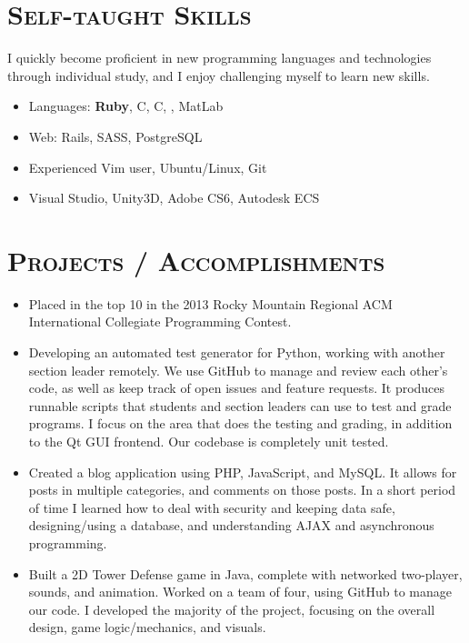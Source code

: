 \documentclass[11pt,letterpaper]{article}
\newcommand{\CPP}
{C\nolinebreak[4]\hspace{-.05em}\raisebox{.22ex}{\footnotesize\bf ++}}
\newcommand{\CS}
{C\nolinebreak[4]\hspace{-.05em}\raisebox{.22ex}{\footnotesize\bf \#}}
\begin{document}
\begin{minipage}{\textwidth}
\section{\scshape Self-taught Skills}
\vspace{-3mm}
I quickly become proficient in new programming languages and technologies through individual study,
and I enjoy challenging myself to learn new skills.
\vspace{2mm}
\begin{itemize}
 \item Languages: {\bfseries Ruby}, \CPP, \CS, \textls{\LaTeX}, MatLab
 \item Web: Rails, SASS, PostgreSQL
 \item Experienced Vim user, Ubuntu/Linux, Git
 \item Visual Studio, Unity3D, Adobe CS6, Autodesk ECS
\end{itemize}

\vspace{-3mm}
\section{\scshape Projects / Accomplishments}
\vspace{-3mm}

\begin{itemize}
 \item Placed in the top 10 in the 2013 Rocky Mountain Regional ACM International Collegiate Programming Contest.
 \item Developing an automated test generator for Python, working with another section leader remotely. We use GitHub to
 manage and review each other's code, as well as keep track of open issues and feature requests. It produces runnable
 scripts that students and section leaders can use to test and grade programs. I focus on the
 area that does the testing and grading, in addition to the Qt GUI frontend. Our codebase is
 completely unit tested.
 \item Created a blog application using PHP, JavaScript, and MySQL. It allows for posts in
 multiple categories, and comments on those posts. In a short period of time I learned how to deal with
 security and keeping data safe, designing/using a database, and understanding AJAX and asynchronous programming.
 \item Built a 2D Tower Defense game in Java, complete with networked two-player, sounds, and animation. Worked on 
 a team of four, using GitHub to manage our code. I developed the majority of the project, focusing on the
 overall design, game logic/mechanics, and visuals.
\end{itemize}



\end{minipage}
\end{document}
